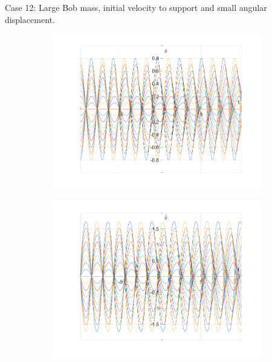 \documentclass{article}
\begin{document}
	Case 12:
	Large Bob mass, initial velocity to support and small angular displacement.	
	\begin{figure}[h!]
		\centering
		\begin{subfigure}[b]{0.48\linewidth}
			\includegraphics[width=\linewidth]{./SmallOscillations/S12/F1.png}
		\end{subfigure}
		\begin{subfigure}[b]{0.48\linewidth}
			\includegraphics[width=\linewidth]{./SmallOscillations/S12/F2.png}
		\end{subfigure}
	\end{figure}
\end{document}
